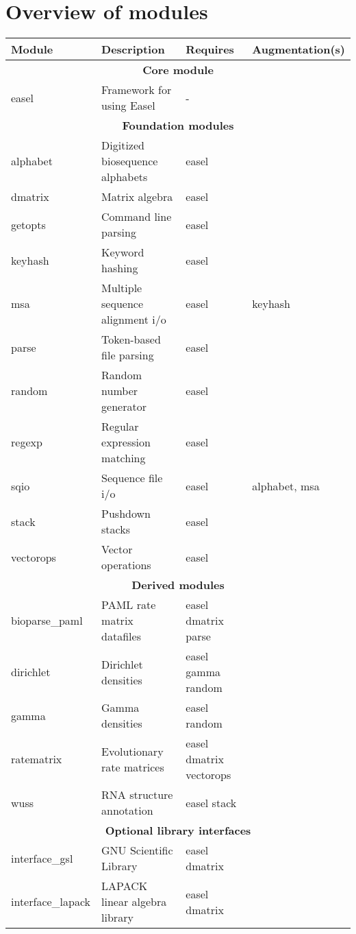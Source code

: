 \section{Overview of modules}
\begin{tabular}{llll}\hline
\textbf{Module} & \textbf{Description}       & \textbf{Requires} & \textbf{Augmentation(s)}\\\hline
  \multicolumn{4}{c}{\textbf{Core module}}\\
easel           & Framework for using Easel         &  -     & \\
  \multicolumn{4}{c}{\textbf{Foundation modules}}\\
alphabet        & Digitized biosequence alphabets   & easel  & \\
dmatrix         & Matrix algebra                    & easel  & \\ 
getopts         & Command line parsing              & easel  & \\
keyhash         & Keyword hashing                   & easel  & \\
msa             & Multiple sequence alignment i/o   & easel  & keyhash \\
parse           & Token-based file parsing          & easel  & \\
random          & Random number generator           & easel  & \\
regexp          & Regular expression matching       & easel  & \\
sqio            & Sequence file i/o                 & easel  & alphabet, msa\\
stack           & Pushdown stacks                   & easel  & \\
vectorops       & Vector operations                 & easel  & \\\hline
  \multicolumn{4}{c}{\textbf{Derived modules}}\\
bioparse\_paml  & PAML rate matrix datafiles        & easel dmatrix parse & \\
dirichlet       & Dirichlet densities               & easel gamma random & \\ 
gamma           & Gamma densities                   & easel random & \\
ratematrix      & Evolutionary rate matrices        & easel dmatrix vectorops & \\
wuss            & RNA structure annotation          & easel stack    & \\\hline
  \multicolumn{4}{c}{\textbf{Optional library interfaces}}\\
interface\_gsl    & GNU Scientific Library          & easel dmatrix & \\
interface\_lapack & LAPACK linear algebra library   & easel dmatrix & \\\hline
\end{tabular}



